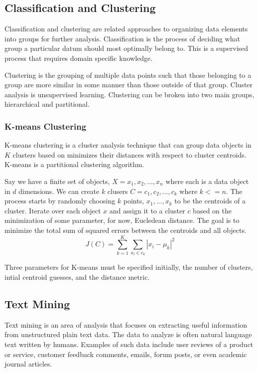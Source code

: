 \documentclass[12pt]{article}
\begin{document}
\begin{doublespacing}
\subsection{Classification and Clustering}
Classification and clustering are related approaches to organizing data elements into groups for further analysis.
Classification is the process of deciding what group a particular datum should most optimally belong to.
This is a supervised process that requires domain specific knowledge.

Clustering is the grouping of multiple data points such that those belonging to a group are more similar in some manner than those outside of that group.
Cluster analysis is unsupervised learning.
Clustering can be broken into two main groups, hierarchical and partitional.

\subsubsection{K-means Clustering}
K-means clustering is a cluster analysis technique that can group data objects in $K$ clusters based on minimizes their distances with respect to cluster centroids.
K-means is a partitional clustering algorithm.

Say we have a finite set of objects,  $X = {x_1, x_2, ..., x_n}$ where each is a data object in $d$ dimensions.
We can create $k$ clusers $C = {c_1, c_2, ..., c_k}$ where $k <= n$.
The process starts by randomly choosing $k$ points, ${x_1, ..., x_k}$ to be the centroids of a cluster.
Iterate over each object $x$ and assign it to a cluster $c$ based on the minimization of some parameter, for now, Eucledean distance.
The goal is to minimize the total sum of squared errors between the centroids and all objects. 
\begin{equation} \label{kmeans}
J(C) = \sum^K_{k=1} \sum_{x_i \in c_k} \left| x_i - \mu_k \right| ^2
\end{equation}

Three parameters for K-means must be specified initially, the number of clusters, intial centroid guesses, and the distance metric.




\subsection{Text Mining}
Text mining is an area of analysis that focuses on extracting useful information from unstructured plain text data.
The data to analyze is often natural language text written by humans.
Examples of such data include user reviews of a product or service, customer feedback comments, emails, forum posts, or even academic journal articles.


\end{doublespacing}
\end{document}
